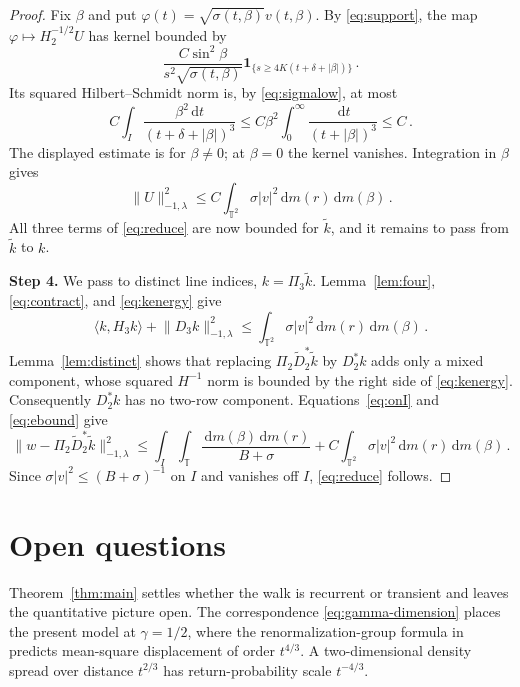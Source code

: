\documentclass[11pt]{amsart}
\theoremstyle{plain}
\theoremstyle{definition}
\newcommand{\T}{\mathbb T}
\newcommand{\1}{\mathbf 1}
\newcommand{\ip}[2]{\langle #1,#2\rangle}
\newcommand{\norm}[1]{\lVert #1\rVert}
\newcommand{\abs}[1]{\lvert #1\rvert}
\newcommand{\dd}{\,\mathrm d}
\newcommand{\Hminus}[1]{\norm{#1}_{-1,\lambda}}
\begin{document}
\begin{proof}
Fix $\beta$ and put
$\varphi(t)=\sqrt{\sigma(t,\beta)}v(t,\beta)$.  By
\eqref{eq:support}, the map
$\varphi\mapsto H_2^{-1/2}U$ has kernel bounded by
\[
  \frac{C\sin^2\beta}{s^2\sqrt{\sigma(t,\beta)}}
  \1_{\{s\geq4K(t+\delta+\abs\beta)\}}\, .
\]
Its squared Hilbert--Schmidt norm is, by \eqref{eq:sigmalow}, at most
\[
  C\int_I\frac{\beta^2\dd t}{(t+\delta+\abs\beta)^3}
  \leq C\beta^2\int_0^\infty
  \frac{\dd t}{(t+\abs\beta)^3}\leq C\, .
\]
The displayed estimate is for $\beta\neq0$; at $\beta=0$ the kernel
vanishes.
Integration in $\beta$ gives
\begin{equation}\label{eq:ebound}
  \Hminus U^2\leq
  C\int_{\T^2}\sigma\abs v^2\dd m(r)\dd m(\beta)\, .
\end{equation}
All three terms of \eqref{eq:reduce} are now bounded for $\widetilde k$, and
it remains to pass from $\widetilde k$ to $k$.

\noindent\textbf{Step 4.}  We pass to distinct line indices, $k=\Pi_3\widetilde k$.
Lemma~\ref{lem:four},
\eqref{eq:contract}, and \eqref{eq:kenergy} give
\[
  \ip k{H_3k}+\Hminus{D_3k}^2
  \leq\int_{\T^2}\sigma\abs v^2\dd m(r)\dd m(\beta)\, .
\]
Lemma~\ref{lem:distinct} shows that replacing
$\Pi_2\widetilde D_2^*\widetilde k$ by $D_2^*k$ adds only a mixed component,
whose squared $H^{-1}$ norm is bounded by the right side of
\eqref{eq:kenergy}.  Consequently $D_2^*k$ has no two-row component.
Equations~\eqref{eq:onI} and \eqref{eq:ebound} give
\[
  \Hminus{w-\Pi_2\widetilde D_2^*\widetilde k}^2
  \leq\int_I\int_\T\frac{\dd m(\beta)\dd m(r)}{B+\sigma}
  +C\int_{\T^2}\sigma\abs v^2\dd m(r)\dd m(\beta)\, .
\]
Since $\sigma\abs v^2\leq(B+\sigma)^{-1}$ on $I$ and vanishes off $I$,
\eqref{eq:reduce} follows.
\end{proof}

\section{Open questions}\label{sec:open}

Theorem~\ref{thm:main} settles whether the walk is recurrent or transient
and leaves the quantitative picture open.  The correspondence \eqref{eq:gamma-dimension}
places the present model at $\gamma=1/2$, where the renormalization-group
formula in \citet*[(1.3) and the discussion following it]{ABK26} predicts
mean-square displacement of order $t^{4/3}$.  A two-dimensional density
spread over distance $t^{2/3}$ has return-probability scale $t^{-4/3}$.
\end{document}
